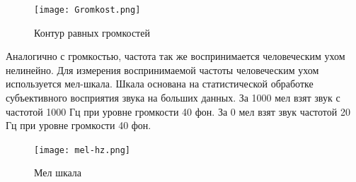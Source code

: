 \begin{figure}
\centering
	\texttt{[image: Gromkost.png]}
	\caption{Контур равных громкостей}
	\label{sec:analysus:sound_contur}
\end{figure}

Аналогично с громкостью, частота так же воспринимается человеческим ухом нелинейно. Для измерения воспринимаемой частоты человеческим ухом используется мел-шкала. Шкала основана на статистической обработке субъективного восприятия звука на больших данных. За 1000 мел взят звук с частотой 1000 Гц при уровне громкости 40 фон. За 0 мел взят звук частотой 20 Гц при уровне громкости 40 фон.

\begin{figure}
\centering
	\texttt{[image: mel-hz.png]}
	\caption{Мел шкала}
	\label{sec:analysus:mel}
\end{figure}
